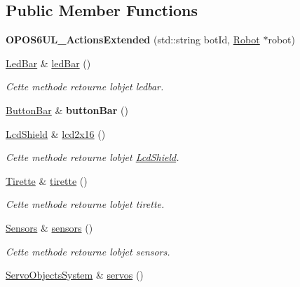 \subsection*{Public Member Functions}
\begin{DoxyCompactItemize}
\item 
\mbox{\label{classOPOS6UL__ActionsExtended_aced00f2c03b0aa9b9eda54e6874bac75}} 
{\bfseries O\+P\+O\+S6\+U\+L\+\_\+\+Actions\+Extended} (std\+::string bot\+Id, \hyperlink{classRobot}{Robot} $\ast$robot)
\item 
\hyperlink{classLedBar}{Led\+Bar} \& \hyperlink{classOPOS6UL__ActionsExtended_a45cbc8df7fe022adea06aa127b94069c}{led\+Bar} ()
\begin{DoxyCompactList}\small\item\em Cette methode retourne l\textquotesingle{}objet ledbar. \end{DoxyCompactList}\item 
\mbox{\label{classOPOS6UL__ActionsExtended_a1e1b2ca9a7404b1322c8e566de3b3f52}} 
\hyperlink{classButtonBar}{Button\+Bar} \& {\bfseries button\+Bar} ()
\item 
\hyperlink{classLcdShield}{Lcd\+Shield} \& \hyperlink{classOPOS6UL__ActionsExtended_a92c4b04808832f55fa7b68a9678307b1}{lcd2x16} ()
\begin{DoxyCompactList}\small\item\em Cette methode retourne l\textquotesingle{}objet \hyperlink{classLcdShield}{Lcd\+Shield}. \end{DoxyCompactList}\item 
\hyperlink{classTirette}{Tirette} \& \hyperlink{classOPOS6UL__ActionsExtended_a790945aecd3fcc71bf1c8de38859c7c4}{tirette} ()
\begin{DoxyCompactList}\small\item\em Cette methode retourne l\textquotesingle{}objet tirette. \end{DoxyCompactList}\item 
\hyperlink{classSensors}{Sensors} \& \hyperlink{classOPOS6UL__ActionsExtended_a3475484a307a07d60fd57fb9f49be8f5}{sensors} ()
\begin{DoxyCompactList}\small\item\em Cette methode retourne l\textquotesingle{}objet sensors. \end{DoxyCompactList}\item 
\hyperlink{classServoObjectsSystem}{Servo\+Objects\+System} \& \hyperlink{classOPOS6UL__ActionsExtended_a1a6ccdf4aae1302cdf664d32ae5a67c6}{servos} ()

\end{DoxyCompactItemize}
